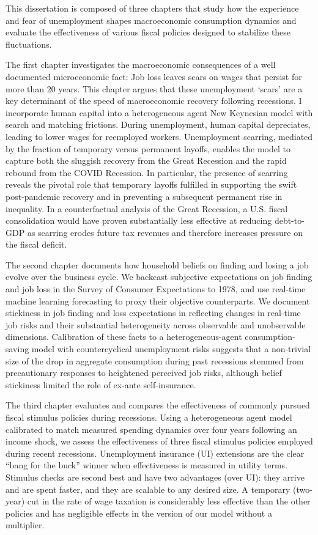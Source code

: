 %

This dissertation is composed of three chapters that study how the experience and fear of unemployment shapes macroeconomic consumption dynamics and evaluate the effectiveness of various fiscal policies designed to stabilize these fluctuations.

The first chapter investigates the macroeconomic consequences of a well documented microeconomic fact: Job loss leaves scars on wages that persist for more than 20 years. This chapter argues that these unemployment `scars' are a key determinant of the speed of macroeconomic recovery following recessions. I incorporate human capital into a heterogeneous agent New Keynesian model with search and matching frictions. During unemployment, human capital depreciates, leading to lower wages for reemployed workers. Unemployment scarring, mediated by the fraction of temporary versus permanent layoffs, enables the model to capture both the sluggish recovery from the Great Recession and the rapid rebound from the COVID Recession. In particular, the presence of scarring reveals the pivotal role that temporary layoffs fulfilled in supporting the swift post-pandemic recovery and in preventing a subsequent permanent rise in inequality. In a counterfactual analysis of the Great Recession, a U.S. fiscal consolidation would have proven substantially less effective at reducing debt-to-GDP as scarring erodes future tax revenues and therefore increases pressure on the fiscal deficit.

The second chapter documents how household beliefs on finding and losing a job evolve over the business cycle. We backcast subjective expectations on job finding and job loss in the Survey of Consumer Expectations to 1978, and use real-time machine learning forecasting to proxy their objective counterparts. We document stickiness in job finding and loss expectations in reflecting changes in real-time job risks and their substantial heterogeneity across observable and unobservable dimensions. Calibration of these facts to a heterogeneous-agent consumption-saving model with countercyclical unemployment risks suggests that a non-trivial size of the drop in aggregate consumption during past recessions stemmed from precautionary responses to heightened perceived job risks, although belief stickiness limited the role of ex-ante self-insurance.

The third chapter evaluates and compares the effectiveness of commonly pursued fiscal stimulus policies during recessions. Using a heterogeneous agent model calibrated to match measured spending dynamics over four years following an income shock, we assess the effectiveness of three fiscal stimulus policies employed during recent recessions. Unemployment insurance (UI) extensions are the clear “bang for the buck” winner when effectiveness is measured in utility terms. Stimulus checks are second best and have two advantages (over UI): they arrive and are spent faster, and they are scalable to any desired size. A temporary (two-year) cut in the rate of wage taxation is considerably less effective than the other policies and has negligible effects in the version of our model without a multiplier.


